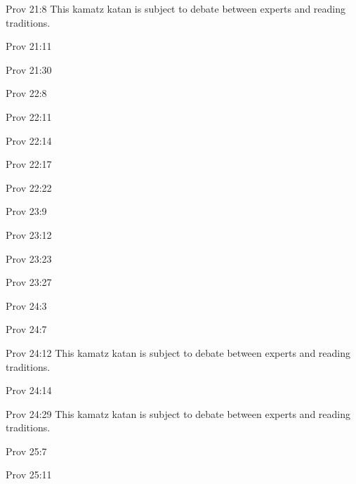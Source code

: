 \documentclass[14pt]{article}
\begin{document}
\begin{itemize}
{{{{{{{{{{{{{{\item Prov 21:8 This kamatz katan is subject to debate between experts and reading traditions.

\item Prov 21:11

\item Prov 21:30

\item Prov 22:8

\item Prov 22:11

\item Prov 22:14

\item Prov 22:17

\item Prov 22:22

\item Prov 23:9

\item Prov 23:12

\item Prov 23:23

\item Prov 23:27

\item Prov 24:3

\item Prov 24:7

\item Prov 24:12 This kamatz katan is subject to debate between experts and reading traditions.

\item Prov 24:14

\item Prov 24:29 This kamatz katan is subject to debate between experts and reading traditions.

\item Prov 25:7

\item Prov 25:11

}}}}}}}}}}}}}}
\end{itemize}
\end{document}
